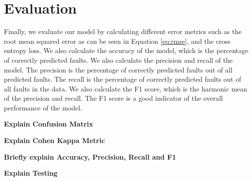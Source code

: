 \section{Evaluation}
\label{sec:model_evaluation}

Finally, we evaluate our model by calculating different error metrics such as the root mean squared error as can be seen in Equation \ref{eq:rmse}, and the cross entropy loss. We also calculate the accuracy of the model, which is the percentage of correctly predicted faults. We also calculate the precision and recall of the model. The precision is the percentage of correctly predicted faults out of all predicted faults. The recall is the percentage of correctly predicted faults out of all faults in the data. We also calculate the F1 score, which is the harmonic mean of the precision and recall. The F1 score is a good indicator of the overall performance of the model.


\textbf{Explain Confusion Matrix}

\textbf{Explain Cohen Kappa Metric}

\textbf{Briefly explain Accuracy, Precision, Recall and F1}

\textbf{Explain Testing}